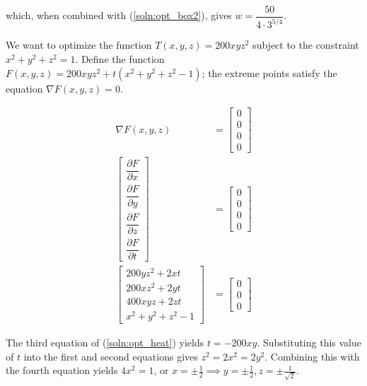 which, when combined with (\ref{soln:opt_box2}), gives
$w = \dfrac{50}{4\cdot3^{5/4}}$.

\item

We want to optimize the function $T(x,y,z) = 200xyz^2$ subject to the
constraint $x^2+y^2+z^2 = 1$.  Define the function
$F(x,y,z) = 200xyz^2 + t(x^2+y^2+z^2-1)$; the extreme points satisfy the
equation $\nabla F(x,y,z) = 0$.

\begin{align}
 \nabla F(x,y,z) &= \begin{bmatrix} 0 \\ 0 \\ 0 \\ 0 \end{bmatrix} \nonumber \\
 \begin{bmatrix}
  \dfrac{\partial F}{\partial x} \\
  \dfrac{\partial F}{\partial y} \\
  \dfrac{\partial F}{\partial z} \\
  \dfrac{\partial F}{\partial t}
 \end{bmatrix} &= \begin{bmatrix} 0 \\ 0 \\ 0 \\ 0 \end{bmatrix} \nonumber \\
 \begin{bmatrix}
  200yz^2 + 2xt \\
  200xz^2 + 2yt \\
  400xyz + 2zt \\
  x^2 + y^2 + z^2 - 1
 \end{bmatrix} &= \begin{bmatrix} 0 \\ 0 \\ 0 \end{bmatrix} \label{soln:opt_heat}
\end{align}

The third equation of (\ref{soln:opt_heat}) yields $t = -200xy$.  Substituting
this value of $t$ into the first and second equations gives $z^2 = 2x^2 = 2y^2$.
Combining this with the fourth equation yields $4x^2 = 1$, or
$x = \pm \frac{1}{2} \implies y = \pm \frac{1}{2}, z = \pm \frac{1}{\sqrt{2}}$.



\EEN
